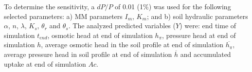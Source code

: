 To determine the sensitivity, a $dP/P$ of 0.01 (1\%) was used for the following selected parameters: 
a) MM parameters $I_m$, $K_m$; and  
b) soil hydraulic parameters $\alpha$, $n$, $\lambda$, $K_s$, $\theta_r$ and $\theta_s$.
The analyzed predicted variables ($Y$) were: end time of simulation $t_{end}$, osmotic head at end of simulation $h_{\pi}$, pressure head at end of simulation $h$, average osmotic head in the soil profile at end of simulation $\overline{h_{\pi}}$, average pressure head in soil profile at end of simulation $\overline{h}$ and accumulated uptake at end of simulation $Ac$.
%
%
%
%
%
%
%
